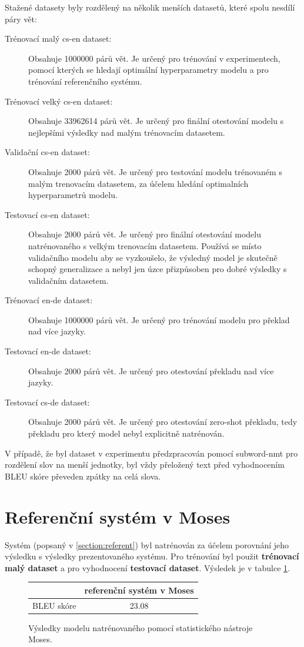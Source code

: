 Stažené datasety byly rozdělený na několik menších datasetů, které spolu nesdílí páry vět:
\begin{description}
  \item[Trénovací malý cs-en dataset:] Obsahuje 1000000 párů vět. Je určený pro trénování v experimentech, pomocí kterých se hledají optimální hyperparametry modelu a pro trénování referenčního systému.
  \item[Trénovací velký cs-en dataset:] Obsahuje 33962614 párů vět. Je určený pro finální otestování modelu s nejlepšími výsledky nad malým trénovacím datasetem.
  \item[Validační cs-en dataset:] Obsahuje 2000 párů vět. Je určený pro testování modelu trénovaném s malým trenovacím datasetem, za účelem hledání optimalních hyperparametrů modelu.
  \item[Testovací cs-en dataset:] Obsahuje 2000 párů vět. Je určený pro finální otestování modelu natrénovaného s velkým trenovacím datasetem. Používá se místo validačního modelu aby se vyzkoušelo, že výsledný model je skutečně schopný generalizace a nebyl jen úzce přizpůsoben pro dobré výsledky s validačním datasetem.
  \item[Trénovací en-de dataset:] Obsahuje 1000000 párů vět. Je určený pro trénování modelu pro překlad nad více jazyky.
  \item[Testovací en-de dataset:] Obsahuje 2000 párů vět. Je určený pro otestování překladu nad více jazyky.
  \item[Testovací cs-de dataset:] Obsahuje 2000 párů vět. Je určený pro otestování zero-shot překladu, tedy překladu pro který model nebyl explicitně natrénován.
\end{description}

V případě, že byl dataset v experimentu předzpracován pomocí subword-nmt pro rozdělení slov na menší jednotky, byl vždy přeložený text před vyhodnocením BLEU skóre převeden zpátky na celá slova.

\section{Referenční systém v Moses}
Systém (popsaný v \ref{section:referent}) byl natrénován za účelem porovnání jeho výsledku s výsledky prezentovaného systému. Pro trénování byl použit \textbf{trénovací malý dataset} a pro vyhodnocení \textbf{testovací dataset}. Výsledek je v tabulce \ref{table:referent}.

\begin{figure}[H]
    \begin{center}
        \begin{tabular}{c|c}
          & referenční systém v Moses  \\
          \hline
          BLEU skóre & 23.08\\
          \hline
        \end{tabular}
    \end{center}
	\caption{Výsledky modelu natrénovaného pomocí statistického nástroje Moses.}
	\label{table:referent}
\end{figure}

